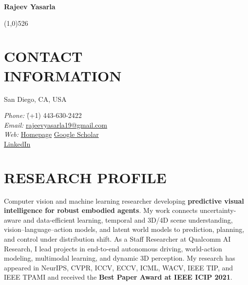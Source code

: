 \documentclass[margin,11pt]{resume}
\begin{document}
\hoffset\centerline{\Large \bf Rajeev Yasarla}
\hoffset\centerline{\line(1,0){526}}

\section{\footnotesize {\normalsize C}ONTACT\\ {\normalsize I}NFORMATION}
\begin{minipage}{0.58\textwidth}
\vspace{-2.4em}
San Diego, CA, USA
\end{minipage}
\begin{minipage}{0.38\textwidth}
\begin{tabbing}
\textit{Phone:} \= (+1) 443-630-2422\\
\textit{Email:} \> \href{mailto:rajeevyasarla19@gmail.com}{rajeevyasarla19@gmail.com}\\
\textit{Web:} \> \href{https://rajeevyasarla.github.io/rajeev.github.io}{Homepage} \quad
\href{https://scholar.google.com/citations?user=R8dwrxEAAAAJ&hl=en}{Google Scholar}\\
\textit{} \> \href{https://www.linkedin.com/in/rajeev-yasarla-7275205b/}{LinkedIn}
\end{tabbing}
\end{minipage}
\vspace{-1.5em}

\section{\footnotesize {\large R}ESEARCH {\large P}ROFILE}
Computer vision and machine learning researcher developing \textbf{predictive visual intelligence for robust embodied agents}. My work connects uncertainty-aware and data-efficient learning, temporal and 3D/4D scene understanding, vision--language--action models, and latent world models to prediction, planning, and control under distribution shift. As a Staff Researcher at Qualcomm AI Research, I lead projects in end-to-end autonomous driving, world-action modeling, multimodal learning, and dynamic 3D perception. My research has appeared in NeurIPS, CVPR, ICCV, ECCV, ICML, WACV, IEEE TIP, and IEEE TPAMI and received the \textbf{Best Paper Award at IEEE ICIP 2021}.

\vspace{-0.7em}
\end{document}
